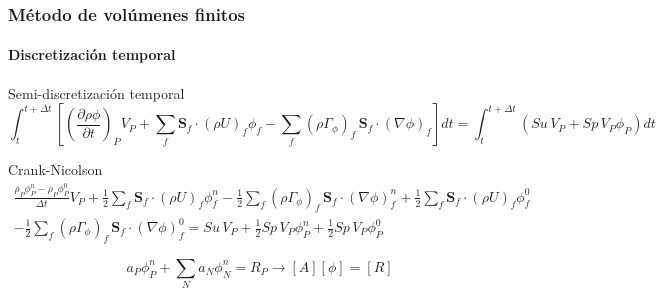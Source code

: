 \begin{frame}
    \frametitle{M\'etodo de vol\'umenes finitos}
    \framesubtitle{Discretizaci\'on temporal}
       
    \begin{exampleblock}{\centering Semi-discretizaci\'on temporal}
        \tiny
        \begin{equation*}
            \int_t^{t+\Delta t}\left [ \left ( \frac{\partial \rho \phi}{\partial t} \right)_P V_{P} + 
            \displaystyle \sum_f \mathbf{S}_f \cdot (\rho U)_f \phi_f - 
            \displaystyle \sum_f (\rho \Gamma_{\phi})_f \, \mathbf{S}_f \cdot (\nabla \phi)_f \right]  dt= 
            \int_t^{t+\Delta t}\left ( Su\, V_P + Sp\, V_P\phi_P \right ) dt 
        \end{equation*}
    \end{exampleblock}        

    \begin{block}{Crank-Nicolson}
        \footnotesize
        \begin{eqnarray*}
            \frac{\rho_P \phi_P^n - \rho_P \phi_P^0}{\Delta t}V_P 
            + 
            \frac{1}{2} \displaystyle \sum_f \mathbf{S}_f \cdot (\rho U)_f \phi_f^n 
            - 
            \frac{1}{2} \displaystyle \sum_f (\rho \Gamma_{\phi})_f \, \mathbf{S}_f \cdot (\nabla \phi)_f^n 
            +
            \frac{1}{2} \displaystyle \sum_f \mathbf{S}_f \cdot (\rho U)_f \phi_f^0             \\
            - 
            \frac{1}{2} \displaystyle \sum_f (\rho \Gamma_{\phi})_f \, \mathbf{S}_f \cdot (\nabla \phi)_f^0  
            =
            Su\,V_P 
            +
            \frac{1}{2}Sp\, V_P\phi_P^n
            +
            \frac{1}{2}Sp\, V_P\phi_P^0
        \end{eqnarray*}
    \end{block}  
    
    $$
    a_P \phi_P^n + \sum_N a_N \phi_N^n = R_P  \rightarrow [A][\phi] = [R]
    $$  

\end{frame}









